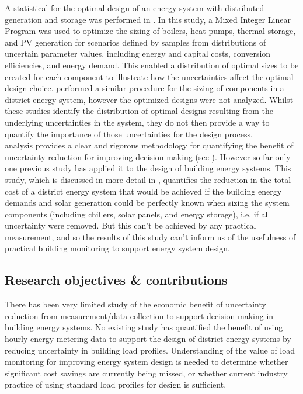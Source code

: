 A statistical  for the optimal design of an energy system with distributed generation and storage was performed in \citep{mavromatidis2018UncertaintyGlobalSensitivity}. In this study, a Mixed Integer Linear Program was used to optimize the sizing of boilers, heat pumps, thermal storage, and PV generation for scenarios defined by samples from distributions of uncertain parameter values, including energy and capital costs, conversion efficiencies, and energy demand. This enabled a distribution of optimal sizes to be created for each component to illustrate how the uncertainties affect the optimal design choice. \citep{pickering2019DistrictEnergySystem} performed a similar procedure for the sizing of components in a district energy system, however the optimized designs were not analyzed. Whilst these studies identify the distribution of optimal designs resulting from the underlying uncertainties in the system, they do not then provide a way to quantify the importance of those uncertainties for the design process.\\

 analysis provides a clear and rigorous methodology for quantifying the benefit of uncertainty reduction for improving decision making (see ). However so far only one previous study has applied it to the design of building energy systems. This study, \citep{niu2023FrameworkQuantifyingValue} which is discussed in more detail in , quantifies the reduction in the total cost of a district energy system that would be achieved if the building energy demands and solar generation could be perfectly known when sizing the system components (including chillers, solar panels, and energy storage), i.e. if all uncertainty were removed. But this can't be achieved by any practical measurement, and so the results of this study can't inform us of the usefulness of practical building monitoring to support energy system design.


\newpage
\subsection{Research objectives \& contributions}

There has been very limited study of the economic benefit of uncertainty reduction from measurement/data collection to support decision making in building energy systems. No existing study has quantified the benefit of using hourly energy metering data to support the design of district energy systems by reducing uncertainty in building load profiles.
Understanding of the value of load monitoring for improving energy system design is needed to determine whether significant cost savings are currently being missed, or whether current industry practice of using standard load profiles for design is sufficient.

